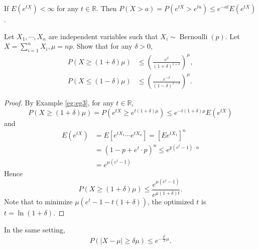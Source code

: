 \documentclass[11pt,singlecolumn, openany, citestyle=authoryear]{elegantbook}
\begin{document}
\begin{CJK}{UTF8}{gbsn}
\begin{example}\label{eg:eg3}
    If $E(e^{tX})<\infty$ for any $t\in\mathbb{R}$. Then 
    $P(X>a)=P(e^{tX}>e^{ta})\leqslant e^{-at}E(e^{tX})$.
\end{example}

\begin{exercise}
    Let $X_1,\cdots,X_n$ are independent variables such that 
    $X_i\sim \operatorname{Bernoulli}(p)$. Let $X=\displaystyle \sum_{i=1}^n X_i,
    \mu=np$. Show that for any $\delta>0$,
    \begin{align*}
    P(X\geqslant(1+\delta)\mu)&\leqslant \left(
        \frac{e^{\delta}}{(1+\delta)^{1+\delta}}
    \right)^\mu, \\
    P(X\leqslant(1-\delta)\mu)&\leqslant \left(
        \frac{e^{-\delta}}{(1-\delta)^{1-\delta}}
    \right)^\mu.
    \end{align*}
\end{exercise}
\begin{proof}
    By Example \ref{eg:eg3}, for any $t\in\mathbb{R}$,
    $$
    P(X\geqslant(1+\delta)\mu)=P(e^{tX}\geqslant e^{t(1+\delta)\mu})\leqslant
    e^{-t(1+\delta)\mu}E(e^{tX})
    $$
    and 
    \begin{align*}
        E(e^{tX})&=E[e^{tX_1}\cdots e^{tX_n}]=[Ee^{tX_1}]^n \\
        &=(1-p+e^t\cdot p)^n \leqslant e^{p(e^t-1)\cdot n}\\
        &=e^{\mu(e^t-1)}
    \end{align*}
    Hence
    $$
    P(X\geqslant(1+\delta)\mu)\leqslant \frac{e^{\mu(e^t-1)}}{e^{\mu(1+\delta)t}}.
    $$ 
    Note that to minimize $\mu (e^t-1-t(1+\delta))$, the optimized 
    $t$ is $t=\ln(1+\delta)$.  
\end{proof}
\begin{corollary}
    In the same setting,
    $$
    P(|X-\mu|\geqslant \delta\mu)\leqslant e^{-\frac{\delta^2}{3}\mu}.
    $$
\end{corollary}


\end{CJK}
\end{document}
